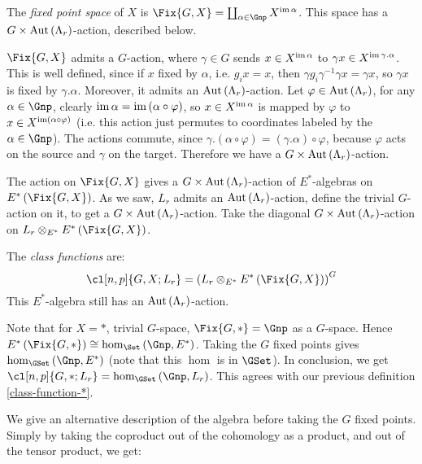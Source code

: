 \begin{definition}
	The \emph{fixed point space} of $X$ is $\Fix{G,X} = \coprod_{\alpha \in \Gnp} X^{\im \alpha}$.
	This space has a $G \times \operatorname{Aut} \left(\Lambda_r\right)$-action, described below.
\end{definition}

$\Fix{G,X}$ admits a $G$-action, where $\gamma \in G$ sends $x \in X^{\operatorname{im} \alpha}$ to $\gamma x \in X^{\operatorname{im} \gamma.\alpha}$.
This is well defined, since if $x$ fixed by $\alpha$, i.e. $g_i x = x$, then $\gamma g_i \gamma^{-1} \gamma x = \gamma x$, so $\gamma x$ is fixed by $\gamma. \alpha$.
Moreover, it admits an $\operatorname{Aut}\left(\Lambda_r\right)$-action.
Let $\varphi \in \operatorname{Aut}\left(\Lambda_r\right)$, for any $\alpha \in \Gnp$, clearly $\operatorname{im} \alpha = \operatorname{im} \left(\alpha\circ\varphi\right)$, so $x \in X^{\operatorname{im} \alpha}$ is mapped by $\varphi$ to $x \in X^{\operatorname{im} \left(\alpha\circ\varphi\right)}$ (i.e. this action just permutes to coordinates labeled by the $\alpha \in \Gnp$).
The actions commute, since $\gamma.\left(\alpha \circ \varphi\right) = \left(\gamma.\alpha\right) \circ \varphi$, because $\varphi$ acts on the source and $\gamma$ on the target.
Therefore we have a $G \times \operatorname{Aut} \left(\Lambda_r\right)$-action.

The action on $\Fix{G,X}$ gives a $G \times \operatorname{Aut} \left(\Lambda_r\right)$-action of $E^*$-algebras on $E^*\left(\Fix{G,X}\right)$.
As we saw, $L_r$ admits an $\operatorname{Aut} \left(\Lambda_r\right)$-action, define the trivial $G$-action on it, to get a $G \times \operatorname{Aut} \left(\Lambda_r\right)$-action.
Take the diagonal $G \times \operatorname{Aut} \left(\Lambda_r\right)$-action on $L_r \otimes_{E^*} E^*\left(\Fix{G,X}\right)$.

\begin{definition}
	The \emph{class functions} are:
	$$
	\cl[n,p]{G,X; L_r}
	= \left(L_r \otimes_{E^*} E^*\left(\Fix{G,X}\right)\right)^G
	$$
	This $E^*$-algebra still has an $\operatorname{Aut} \left(\Lambda_r\right)$-action.
\end{definition}

Note that for $X = *$, trivial $G$-space, $\Fix{G,*} = \Gnp$ as a $G$-space.
Hence $E^*\left(\Fix{G,*}\right) \cong \hom_{\Set}\left(\Gnp, E^*\right)$.
Taking the $G$ fixed points gives $\hom_{\GSet}\left(\Gnp, E^*\right)$ (note that this $\hom$ is in $\GSet$).
In conclusion, we get $\cl[n,p]{G,*; L_r} =  \hom_{\GSet}\left(\Gnp, L_r\right)$.
This agrees with our previous definition \ref{class-function-*}.

We give an alternative description of the algebra before taking the $G$ fixed points.
Simply by taking the coproduct out of the cohomology as a product, and out of the tensor product, we get:

